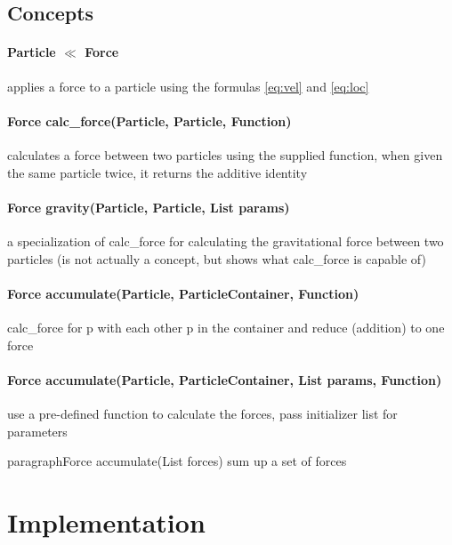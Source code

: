 \documentclass[runningheads,a4paper]{llncs}
\begin{document}
\subsection{Concepts}

\paragraph{Particle $\ll$ Force}
applies a force to a particle using the formulas \ref{eq:vel} and \ref{eq:loc}

\paragraph{Force calc\_force(Particle, Particle, Function)}
calculates a force between two particles using the supplied function, when given the same particle twice, it returns the additive identity

\paragraph{Force gravity(Particle, Particle, List params)}
a specialization of calc\_force for calculating the gravitational force between two particles (is not actually a concept, but shows what calc\_force is capable of)

\paragraph{Force accumulate(Particle, ParticleContainer, Function)}
calc\_force for p with each other p in the container and reduce (addition) to one force

\paragraph{Force accumulate(Particle, ParticleContainer, List params, Function)}
use a pre-defined function to calculate the forces, pass initializer list for parameters

paragraph{Force accumulate(List forces)}
sum up a set of forces


\section{Implementation}
\end{document}

